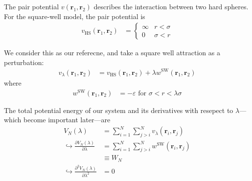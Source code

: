 \documentclass[letterpaper,twocolumn,amsmath,amssymb,prb]{revtex4-1}
\newcommand{\1}{\ensuremath{\textbf{r}_1}}
\newcommand{\2}{\ensuremath{\textbf{r}_2}}
\newcommand{\3}{\ensuremath{\textbf{r}_3}}
\newcommand{\4}{\ensuremath{\textbf{r}_4}}
\begin{document}
The pair potential $v(\1,\2)$ describes the interaction between two
hard spheres. For the square-well model, the pair potential is
\begin{align}
  v_\text{HS}(\1,\2) &=
    \begin{cases}
      \infty & r < \sigma \\
      0 & \sigma < r
    \end{cases}
\end{align}

We consider this as our referecne, and take a square well attraction as a perturbation:
\begin{align}
  v_\lambda(\1,\2) &= v_\text{HS}(\1,\2) + \lambda w^\text{SW}(\1,\2) \label{eqn:small-perturbation}
\end{align}
where
\begin{align}
  w^\text{SW}(\1,\2) &= - \varepsilon \text{ for } \sigma < r < \lambda\sigma
\end{align}

The total potential energy of our system and its derivatives with resepect to $\lambda$---which become important later---are
\begin{align}
  V_N(\lambda) &= \sum_{i=1}^N\sum_{j>i}^N v_\lambda(\mathbf{r}_i,\mathbf{r}_j) \\ %
  \hookrightarrow \frac{\partial V_N(\lambda)}{\partial\lambda} &= \sum_{i=1}^N\sum_{j>i}^N w^\text{SW}(\mathbf{r}_i,\mathbf{r}_j) \nonumber \\
  &\equiv W_N \\
  \hookrightarrow \frac{\partial^2 V_N(\lambda)}{\partial\lambda^2} &= 0
\end{align}
\end{document}
